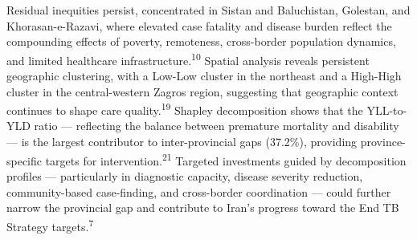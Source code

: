 \documentclass[12pt]{article}
\begin{document}
Residual inequities persist, concentrated in Sistan and Baluchistan, Golestan, and Khorasan-e-Razavi, where elevated case fatality and disease burden reflect the compounding effects of poverty, remoteness, cross-border population dynamics, and limited healthcare infrastructure.\textsuperscript{10} Spatial analysis reveals persistent geographic clustering, with a Low-Low cluster in the northeast and a High-High cluster in the central-western Zagros region, suggesting that geographic context continues to shape care quality.\textsuperscript{19} Shapley decomposition shows that the YLL-to-YLD ratio --- reflecting the balance between premature mortality and disability --- is the largest contributor to inter-provincial gaps (37.2\%), providing province-specific targets for intervention.\textsuperscript{21} Targeted investments guided by decomposition profiles --- particularly in diagnostic capacity, disease severity reduction, community-based case-finding, and cross-border coordination --- could further narrow the provincial gap and contribute to Iran's progress toward the End TB Strategy targets.\textsuperscript{7}


\clearpage
\end{document}
